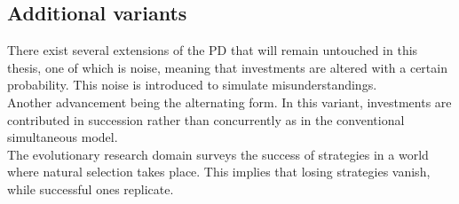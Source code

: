 \documentclass[11pt]{article}
\begin{document}


\subsection{Additional variants}

There exist several extensions of the PD that will remain untouched in this thesis, one of which is noise, meaning that investments are altered with a certain probability.
This noise is introduced to simulate misunderstandings.\\
Another advancement being the alternating form.
In this variant, investments are contributed in succession rather than concurrently as in the conventional simultaneous model.\\
The evolutionary research domain surveys the success of strategies in a world where natural selection takes place.
This implies that losing strategies vanish, while successful ones replicate.
\end{document}
